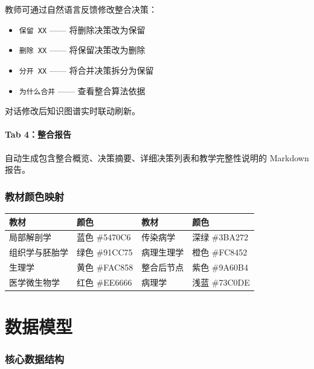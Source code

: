\documentclass[12pt,a4paper]{article}
\begin{document}
教师可通过自然语言反馈修改整合决策：
\begin{itemize}[leftmargin=2em]
    \item \texttt{保留 XX} —— 将删除决策改为保留
    \item \texttt{删除 XX} —— 将保留决策改为删除
    \item \texttt{分开 XX} —— 将合并决策拆分为保留
    \item \texttt{为什么合并} —— 查看整合算法依据
\end{itemize}
对话修改后知识图谱实时联动刷新。

\subsection{Tab 4：整合报告}

自动生成包含整合概览、决策摘要、详细决策列表和教学完整性说明的 Markdown 报告。

\section{教材颜色映射}
\label{sec:colors}

\begin{table}[H]
\centering
\begin{tabular}{llll}
\toprule
\textbf{教材} & \textbf{颜色} & \textbf{教材} & \textbf{颜色} \\
\midrule
局部解剖学 & \textcolor[HTML]{5470C6}{蓝色 \#5470C6} & 传染病学 & \textcolor[HTML]{3BA272}{深绿 \#3BA272} \\
组织学与胚胎学 & \textcolor[HTML]{91CC75}{绿色 \#91CC75} & 病理生理学 & \textcolor[HTML]{FC8452}{橙色 \#FC8452} \\
生理学 & \textcolor[HTML]{FAC858}{黄色 \#FAC858} & 整合后节点 & \textcolor[HTML]{9A60B4}{紫色 \#9A60B4} \\
医学微生物学 & \textcolor[HTML]{EE6666}{红色 \#EE6666} & 病理学 & \textcolor[HTML]{73C0DE}{浅蓝 \#73C0DE} \\
\bottomrule
\end{tabular}
\end{table}


\newpage
\part{数据模型}

\section{核心数据结构}
\end{document}
